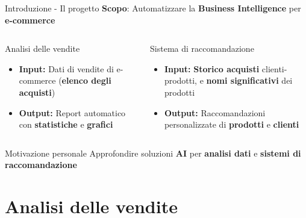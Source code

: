 \documentclass{beamer}
\begin{document}
	\begin{frame}{Introduzione - Il progetto}
		\textbf{Scopo}: Automatizzare la \textbf{Business Intelligence} per \textbf{e-commerce}

		\begin{columns}
			\begin{column}{0.5\textwidth}
				\begin{block}{Analisi delle vendite}
					\begin{itemize}
						\item \textbf{Input:} Dati di vendite di e-commerce (\textbf{elenco degli acquisti})
						\item \textbf{Output:} Report automatico con \textbf{statistiche} e \textbf{grafici}
					\end{itemize}
				\end{block}
			\end{column}
			\begin{column}{0.5\textwidth}
				\begin{block}{Sistema di raccomandazione}
					\begin{itemize}
						\item \textbf{Input:} \textbf{Storico acquisti} clienti-prodotti, e \textbf{nomi significativi} dei prodotti
						\item \textbf{Output:} Raccomandazioni personalizzate di \textbf{prodotti} e \textbf{clienti}
					\end{itemize}
				\end{block}
			\end{column}
		\end{columns}

		\begin{alertblock}{Motivazione personale}
			Approfondire soluzioni \textbf{AI} per \textbf{analisi dati} e \textbf{sistemi di raccomandazione}
		\end{alertblock}
	\end{frame}


	\section{Analisi delle vendite}
\end{document}
